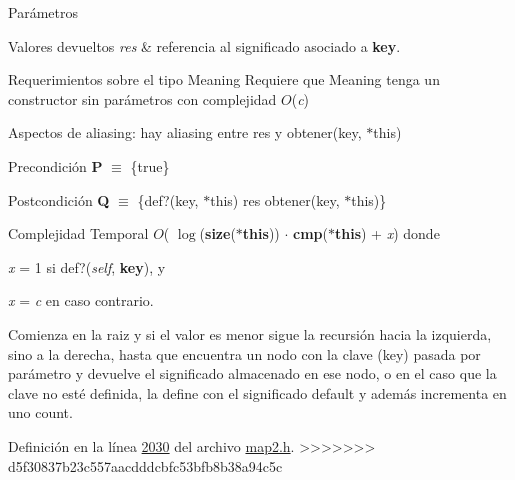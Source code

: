 \begin{DoxyParams}{\-Parámetros}
\begin{DoxyRetVals}{Valores devueltos}
{\em res} & referencia al significado asociado a {\bfseries key}.\\
\hline
\end{DoxyRetVals}
\begin{DoxyParagraph}{Requerimientos sobre el tipo Meaning}
Requiere que Meaning tenga un constructor sin parámetros con complejidad $O$({\itshape c})
\end{DoxyParagraph}
\begin{DoxyParagraph}{Aspectos de aliasing\+:}
hay aliasing entre res y obtener(key, $\ast$this)
\end{DoxyParagraph}
\begin{DoxyPrecond}{Precondición}
{\bfseries P} $\equiv$ \{true\} 
\end{DoxyPrecond}
\begin{DoxyPostcond}{Postcondición}
{\bfseries Q} $\equiv$ \{def?(key, $\ast$this)  res  obtener(key, $\ast$this)\}
\end{DoxyPostcond}

\begin{DoxyDescription}
\item[Complejidad Temporal]$O$( $\log$({\bfseries size}({\bfseries $\ast$this})) $\cdot$ {\bfseries cmp}({\bfseries $\ast$this}) + {\itshape x}) donde
\begin{DoxyItemize}
\item {\itshape x} = 1 si def?({\itshape self}, {\bfseries key}), y
\item {\itshape x} = {\itshape c} en caso contrario.
\end{DoxyItemize}
\end{DoxyDescription}Comienza en la raiz y si el valor es menor sigue la recursión hacia la izquierda, sino a la derecha, hasta que encuentra un nodo con la clave (key) pasada por parámetro y devuelve el significado almacenado en ese nodo, o en el caso que la clave no esté definida, la define con el significado default y además incrementa en uno count. 

Definición en la línea \hyperlink{map2_8h_source_l02030}{2030} del archivo \hyperlink{map2_8h_source}{map2.\+h}.
>>>>>>> d5f30837b23c557aacdddcbfc53bfb8b38a94c5c

\mbox{\label{classaed2_1_1iterator_a3d87256cbfc935a932677092ec57f49a_a3d87256cbfc935a932677092ec57f49a}} 

\end{DoxyParams}
